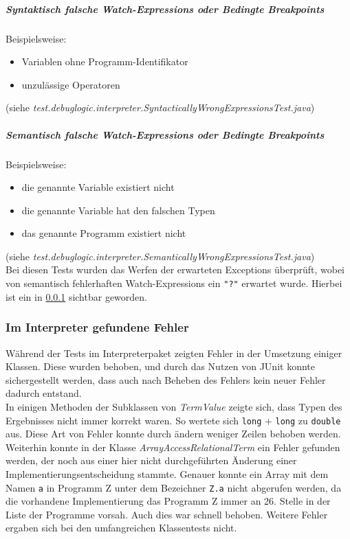 \documentclass[parskip=full]{scrartcl}
\begin{document}
\subparagraph{Syntaktisch falsche Watch-Expressions oder Bedingte Breakpoints}
Beispielsweise:
\begin{itemize}
\item Variablen ohne Programm-Identifikator
\item unzulässige Operatoren
\end{itemize}
(siehe \textit{test.debuglogic.interpreter.SyntacticallyWrongExpressionsTest.java})\\
\subparagraph{Semantisch falsche Watch-Expressions oder Bedingte Breakpoints}
Beispielsweise:
\begin{itemize}
\item die genannte Variable existiert nicht
\item die genannte Variable hat den falschen Typen
\item das genannte Programm existiert nicht
\end{itemize}
(siehe \textit{test.debuglogic.interpreter.SemanticallyWrongExpressionsTest.java})\\
Bei diesen Tests wurden das Werfen der erwarteten Exceptions überprüft, wobei von semantisch fehlerhaften Watch-Expressions ein \texttt{"?"} erwartet wurde. Hierbei ist ein in \ref{fehlerImInterpreter} sichtbar geworden.

\subsubsection{Im Interpreter gefundene Fehler}\label{fehlerImInterpreter}
Während der Tests im Interpreterpaket zeigten Fehler in der Umsetzung einiger Klassen. Diese wurden behoben, und durch das Nutzen von JUnit konnte sichergestellt werden, dass auch nach Beheben des Fehlers kein neuer Fehler dadurch entstand.\\
In einigen Methoden der Subklassen von \textit{TermValue} zeigte sich, dass Typen des Ergebnisses nicht immer korrekt waren. So wertete sich \texttt{long} + \texttt{long} zu \texttt{double} aus. Diese Art von Fehler konnte durch ändern weniger Zeilen behoben werden.\\
Weiterhin konnte in der Klasse \textit{ArrayAccessRelationalTerm} ein Fehler gefunden werden, der noch aus einer hier nicht durchgeführten Änderung einer Implementierungsentscheidung stammte. Genauer konnte ein Array mit dem Namen \texttt{a} in Programm Z unter dem Bezeichner \texttt{Z.a} nicht abgerufen werden, da die vorhandene Implementierung das Programm Z immer an 26. Stelle in der Liste der Programme vorsah. Auch dies war schnell behoben. Weitere Fehler ergaben sich bei den umfangreichen Klassentests nicht.
\end{document}
